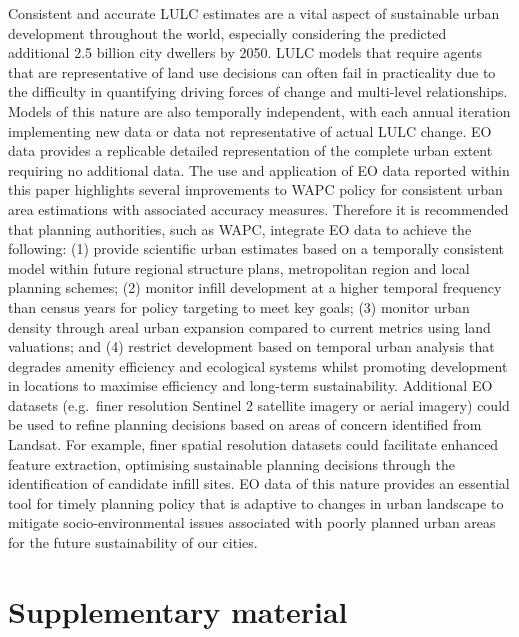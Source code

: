 \documentclass[]{book}
\begin{document}
Consistent and accurate LULC estimates are a vital aspect of sustainable
urban development throughout the world, especially considering the
predicted additional 2.5 billion city dwellers by 2050. LULC models that
require agents that are representative of land use decisions can often
fail in practicality due to the difficulty in quantifying driving forces
of change and multi-level relationships. Models of this nature are also
temporally independent, with each annual iteration implementing new data
or data not representative of actual LULC change. EO data provides a
replicable detailed representation of the complete urban extent
requiring no additional data. The use and application of EO data
reported within this paper highlights several improvements to WAPC
policy for consistent urban area estimations with associated accuracy
measures. Therefore it is recommended that planning authorities, such as
WAPC, integrate EO data to achieve the following: (1) provide scientific
urban estimates based on a temporally consistent model within future
regional structure plans, metropolitan region and local planning
schemes; (2) monitor infill development at a higher temporal frequency
than census years for policy targeting to meet key goals; (3) monitor
urban density through areal urban expansion compared to current metrics
using land valuations; and (4) restrict development based on temporal
urban analysis that degrades amenity efficiency and ecological systems
whilst promoting development in locations to maximise efficiency and
long-term sustainability. Additional EO datasets (e.g.~finer resolution
Sentinel 2 satellite imagery or aerial imagery) could be used to refine
planning decisions based on areas of concern identified from Landsat.
For example, finer spatial resolution datasets could facilitate enhanced
feature extraction, optimising sustainable planning decisions through
the identification of candidate infill sites. EO data of this nature
provides an essential tool for timely planning policy that is adaptive
to changes in urban landscape to mitigate socio-environmental issues
associated with poorly planned urban areas for the future sustainability
of our cities.

\section{Supplementary material}\label{supplementary-material}
\end{document}
